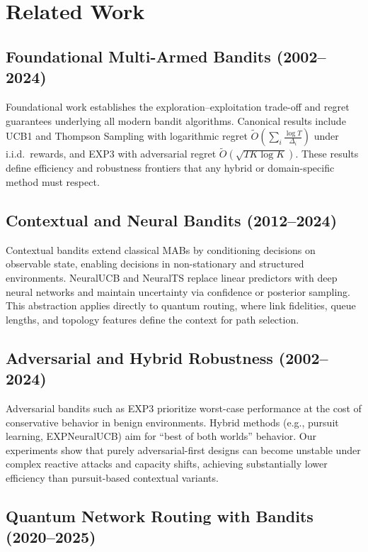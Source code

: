\documentclass[sigconf,anonymous]{acmart}
\begin{document}
\section{Related Work}
\label{sec:related}

\subsection{Foundational Multi-Armed Bandits (2002--2024)}

Foundational work establishes the exploration--exploitation trade-off and regret guarantees underlying all modern bandit algorithms. Canonical results include UCB1 and Thompson Sampling with logarithmic regret $\tilde{O}\!\left(\sum_i \frac{\log T}{\Delta_i}\right)$ under i.i.d.\ rewards, and EXP3 with adversarial regret $\tilde{O}(\sqrt{T K \log K})$. These results define efficiency and robustness frontiers that any hybrid or domain-specific method must respect.

\subsection{Contextual and Neural Bandits (2012--2024)}

Contextual bandits extend classical MABs by conditioning decisions on observable state, enabling decisions in non-stationary and structured environments. NeuralUCB and NeuralTS replace linear predictors with deep neural networks and maintain uncertainty via confidence or posterior sampling. This abstraction applies directly to quantum routing, where link fidelities, queue lengths, and topology features define the context for path selection.

\subsection{Adversarial and Hybrid Robustness (2002--2024)}

Adversarial bandits such as EXP3 prioritize worst-case performance at the cost of conservative behavior in benign environments. Hybrid methods (e.g., pursuit learning, EXPNeuralUCB) aim for ``best of both worlds'' behavior. Our experiments show that purely adversarial-first designs can become unstable under complex reactive attacks and capacity shifts, achieving substantially lower efficiency than pursuit-based contextual variants.

\subsection{Quantum Network Routing with Bandits (2020--2025)}
\end{document}

